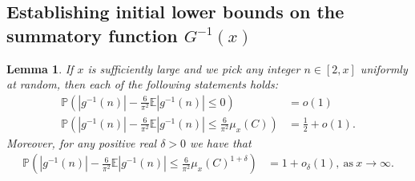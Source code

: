 \documentclass[11pt,reqno,a4letter]{article}
\numberwithin{figure}{section}
\numberwithin{table}{section}
\theoremstyle{plain}
\newtheorem{lemma}[theorem]{Lemma}
\numberwithin{theorem}{section}
\theoremstyle{definition}
\begin{document}
\subsection{Establishing initial lower bounds on the summatory function $G^{-1}(x)$} 
\label{Section_ProofOfValidityOfAverageOrderLowerBounds} 

\begin{lemma} 
\label{lemma_ProbsOfAbsgInvnDist_v2} 
If $x$ is sufficiently large and we pick any integer $n \in [2, x]$ uniformly at random, then 
each of the following statements holds: 
\begin{align*} 
\tag{A}
\mathbb{P}\left(|g^{-1}(n)| - \frac{6}{\pi^2} \mathbb{E}|g^{-1}(n)| \leq 0\right) & = o(1) \\ 
\tag{B} 
\mathbb{P}\left(|g^{-1}(n)| - \frac{6}{\pi^2} \mathbb{E}|g^{-1}(n)| \leq \frac{6}{\pi^2} \mu_x(C)\right) & = 
     \frac{1}{2} + o(1). 
\end{align*} 
Moreover, for any positive real $\delta > 0$ we have that 
\begin{align*} 
\tag{C} 
\mathbb{P}\left(|g^{-1}(n)| - \frac{6}{\pi^2} \mathbb{E}|g^{-1}(n)| \leq \frac{6}{\pi^2} \mu_x(C)^{1 + \delta}\right) & = 
     1 + o_{\delta}(1), 
     \mathrm{\ as\ } x \rightarrow \infty. 
\end{align*} 
\end{lemma} 
\end{document}
